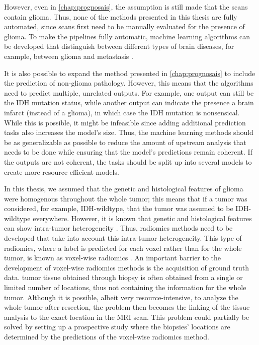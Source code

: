 However, even in \cref{chap:prognosais}, the assumption is still made that the scans contain glioma.
Thus, none of the methods presented in this thesis are fully automated, since scans first need to be manually evaluated for the presence of glioma.
To make the pipelines fully automatic, machine learning algorithms can be developed that distinguish between different types of brain diseases, for example, between glioma and metastasis \autocite{chen2019metastatic}.

It is also possible to expand the method presented in \cref{chap:prognosais} to include the prediction of non-glioma pathology.
However, this means that the algorithms need to predict multiple, unrelated outputs.
For example, one output can still be the \gls{IDH} mutation status, while another output can indicate the presence a brain infarct (instead of a glioma), in which case the \gls{IDH} mutation is nonsensical.
While this is possible, it might be infeasible since adding additional prediction tasks also increases the model's size.
Thus, the machine learning methods should be as generalizable as possible to reduce the amount of upstream analysis that needs to be done while ensuring that the model's predictions remain coherent.
If the outputs are not coherent, the tasks should be split up into several models to create more resource-efficient models.

In this thesis, we assumed that the genetic and histological features of glioma were homogenous throughout the whole \gls{tumor}; this means that if a \gls{tumor} was considered, for example, \gls{IDH}-wildtype, that the \gls{tumor} was assumed to be \gls{IDH}-wildtype everywhere.
However, it is known that genetic and histological features can show intra-\gls{tumor} heterogeneity \autocite{eder2014heterogeneity}.
Thus, radiomics methods need to be developed that take into account this intra-\gls{tumor} heterogeneity.
This type of radiomics, where a label is predicted for each voxel rather than for the whole \gls{tumor}, is known as voxel-wise radiomics \autocite{yogananda20201p19q}.
An important barrier to the development of voxel-wise radiomics methods is the acquisition of ground truth data.
\Gls{tumor} tissue obtained through biopsy is often obtained from a single or limited number of locations, thus not containing the information for the whole \gls{tumor}.
Although it is possible, albeit very resource-intensive, to analyze the whole \gls{tumor} after resection, the problem then becomes the linking of the tissue analysis to the exact location in the \gls{MRI} scan.
This problem could partially be solved by setting up a prospective study where the biopsies' locations are determined by the predictions of the voxel-wise radiomics method.


